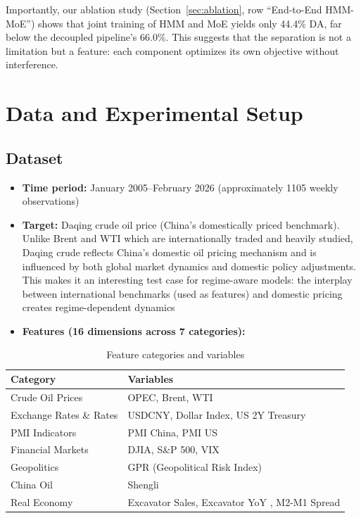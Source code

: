 \documentclass[3p,times]{elsarticle}
\begin{document}
Importantly, our ablation study (Section~\ref{sec:ablation}, row ``End-to-End HMM-MoE'') shows that joint training of HMM and MoE yields only 44.4\% DA, far below the decoupled pipeline's 66.0\%. This suggests that the separation is not a limitation but a feature: each component optimizes its own objective without interference.

\section{Data and Experimental Setup}
\label{sec:setup}

\subsection{Dataset}

\begin{itemize}
\item \textbf{Time period:} January 2005--February 2026 (approximately 1105 weekly observations)
\item \textbf{Target:} Daqing crude oil price (China's domestically priced benchmark). Unlike Brent and WTI which are internationally traded and heavily studied, Daqing crude reflects China's domestic oil pricing mechanism and is influenced by both global market dynamics and domestic policy adjustments. This makes it an interesting test case for regime-aware models: the interplay between international benchmarks (used as features) and domestic pricing creates regime-dependent dynamics
\item \textbf{Features (16 dimensions across 7 categories):}
\end{itemize}

\begin{table}[htbp]
\centering
\caption{Feature categories and variables}
\label{tab:features}
\begin{tabular}{ll}
\toprule
Category & Variables \\
\midrule
Crude Oil Prices & OPEC, Brent, WTI \\
Exchange Rates \& Rates & USDCNY, Dollar Index, US 2Y Treasury \\
PMI Indicators & PMI China, PMI US \\
Financial Markets & DJIA, S\&P 500, VIX \\
Geopolitics & GPR (Geopolitical Risk Index) \\
China Oil & Shengli \\
Real Economy & Excavator Sales, Excavator YoY \citep{sun2023leading}, M2-M1 Spread \citep{chen2021macro} \\
\bottomrule
\end{tabular}
\end{table}
\end{document}
